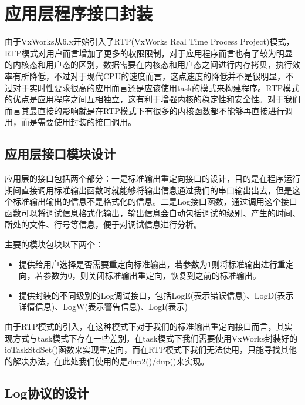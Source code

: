 \chapter{应用层程序接口封装}
	由于VxWorks从6.x开始引入了RTP(VxWorks Real Time Process Project)模式，RTP模式对用户而言增加了更多的权限限制，对于应用程序而言也有了较为明显的内核态和用户态的区别，数据需要在内核态和用户态之间进行内存拷贝，执行效率有所降低，不过对于现代CPU的速度而言，这点速度的降低并不是很明显，不过对于实时性要求很高的应用而言还是应该使用task的模式来构建程序。RTP模式的优点是应用程序之间互相独立，这有利于增强内核的稳定性和安全性。对于我们而言其最直接的影响就是在RTP模式下有很多的内核函数都不能够再直接进行调用，而是需要使用封装的接口调用。
	
	
\section{应用层接口模块设计}

	应用层的接口包括两个部分：一是标准输出重定向接口的设计，目的是在程序运行期间直接调用标准输出函数时就能够将输出信息通过我们的串口输出出去，但是这个标准输出输出的信息不是格式化的信息。二是Log接口函数，通过调用这个接口函数可以将调试信息格式化输出，输出信息会自动包括调试的级别、产生的时间、所处的文件、行号等信息，便于对调试信息进行分析。

主要的模块包块以下两个：
\begin{itemize}
\item {} 提供给用户选择是否需要重定向标准输出，若参数为1则将标准输出进行重定向，若参数为0，则关闭标准输出重定向，恢复到之前的标准输出。




\item {} 提供封装的不同级别的Log调试接口，包括LogE(表示错误信息)、LogD(表示详情信息)、LogW(表示警告信息)、LogI(表示)
\end{itemize}

由于RTP模式的引入，在这种模式下对于我们的标准输出重定向接口而言，其实现方式与task模式下存在一些差别，在task模式下我们需要使用VxWorks封装好的ioTaskStdSet()函数来实现重定向，而在RTP模式下我们无法使用，只能寻找其他的解决办法，在此处我们使用的是dup2()/dup()来实现。


\section{Log协议的设计}

